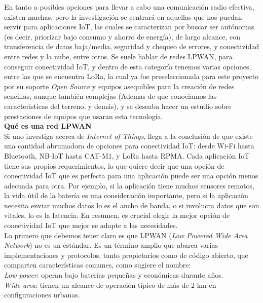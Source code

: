 \documentclass[12pt]{article}
\begin{document}
	\noindent En tanto a posibles opciones para llevar a cabo una comunicación radio efectiva, existen muchas, pero la investigación se centrará en aquellas que nos puedan servir para aplicaciones IoT, las cuales se caracterizan por buscar ser autónomas (es decir, priorizar bajo consumo y ahorro de energía), de largo alcance, con transferencia de datos baja/media, seguridad y chequeo de errores, y conectividad entre redes y la nube, entre otros. Se suele hablar de redes LPWAN, para conseguir conectividad IoT, y dentro de esta categoría tenemos varias opciones, entre las que se encuentra LoRa, la cual ya fue preseleccionada para este proyecto por su soporte \textit{Open Source} y equipos asequibles para la creación de redes sencillas, aunque también complejas (Ademas de que conociamos las caracteristicas del terreno, y demás), y se deseaba hacer un estudio sobre prestaciones de equipos que usaran esta tecnología.\\
	
	\noindent \textbf{Qué es una red LPWAN} \\
	
	\noindent Si uno investiga acerca de \textit{Internet of Things}, llega a la conclusión de que existe una cantidad abrumadora de opciones para conectividad IoT: desde Wi-Fi hasta Bluetooth, NB-IoT hasta CAT-M1, y LoRa hasta RPMA. Cada aplicación IoT tiene sus propios requerimientos, lo que quiere decir que una opción de conectividad IoT que es perfecta para una aplicación puede ser una opción menos adecuada para otra. Por ejemplo, si la aplicación tiene muchos sensores remotos, la vida útil de la batería es una consideración importante, pero si la aplicación necesita enviar muchos datos lo es el ancho de banda, o si involucra datos que son vitales, lo es la latencia. En resumen, es crucial elegir la mejor opción de conectividad IoT que mejor se adapte a las necesidades. \\
	
	\noindent Lo primero que debemos tener claro es que LPWAN (\textit{Low Powered Wide Area Network}) no es un estándar. Es un término amplio que abarca varias implementaciones y protocolos, tanto propietarios como de código abierto, que comparten características comunes, como sugiere el nombre: \\
	
	\noindent \textit{Low power}: operan bajo baterías pequeñas y económicas durante años. \\
	
	\noindent \textit{Wide area}: tienen un alcance de operación típico de más de 2 km en configuraciones urbanas.\\
	
\end{document}
